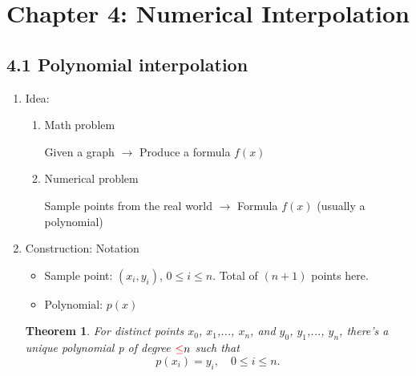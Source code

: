 \documentclass{article}
\newtheorem{thm}{Theorem}[section]
\theoremstyle{remark}
\begin{document}
\section{Chapter 4: Numerical Interpolation}

\subsection{4.1 Polynomial interpolation}

\begin{enumerate}
\item Idea: 
\begin{enumerate}
\item Math problem
\begin{center}
Given a graph $\rightarrow$ Produce a formula $f(x)$
\end{center}
\item Numerical problem
\begin{center}
Sample points from the real world  $\rightarrow$ Formula $f(x)$ (usually a polynomial)
\end{center}
\end{enumerate}


\item Construction: Notation
\begin{itemize}
\item Sample point: $(x_i,y_i)$, $0\leq i\leq n$. Total of $(n+1)$ points here.
\item Polynomial: $p(x)$
\end{itemize}
\begin{thm}
For distinct points $x_0$, $x_1$,..., $x_n$, and $y_0$, $y_1$,..., $y_n$, there's a unique polynomial p of degree ${\color{red} \leq} n$ such that 
$$
p(x_i) = y_i,\quad 0\leq i\leq n.
$$
\end{thm}


\end{enumerate}
\end{document}
